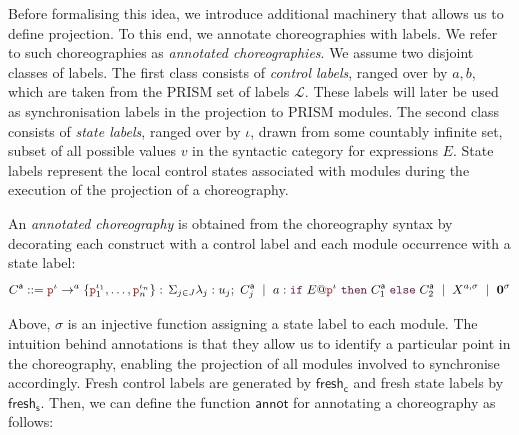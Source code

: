 Before formalising this idea, we introduce additional machinery that
allows us to define projection. To this end, we annotate choreographies
with labels. We refer to such choreographies as \emph{annotated
choreographies}. 
%
We assume two disjoint classes of labels. The first class consists of
\emph{control labels}, ranged over by $a,b$, which are taken from the
PRISM set of labels $\mathcal L$. These labels will later be used as
synchronisation labels in the projection to PRISM modules. The second
class consists of \emph{state labels}, ranged over by $\iota$, drawn
from some countably infinite set, subset of all possible values $v$ in
the syntactic category for expressions $E$. State labels represent the
local control states associated with modules during the execution of
the projection of a choreography.
%
\newcommand{\anno}[1]{{#1}^{\mathsf a}}
%
\begin{definition}
  An \emph{annotated choreography} is obtained from the choreography
  syntax by decorating each construct with a control label and each
  module occurrence with a state label:
  \[\small
    \anno{C} ::= 
      \interactl{\nr^{\iota}}a{\nr_1^{\iota_1},\ldots,\nr_n^{\iota_n}}
      \ \mid\ 
      a:\ifTE{E}{\nr^{\iota}}{\anno{C}_1}{\anno{C}_2}
      \ \mid\ 
      X^{a,\sigma}
      \ \mid\ 
      \CEnd^{\sigma}
  \]
\end{definition}
%
Above, $\sigma$ is an injective function assigning a state label to
each module.  The intuition behind annotations is that they allow us
to identify a particular point in the choreography, enabling the
projection of all modules involved to synchronise accordingly.
%
Fresh control labels are generated by $\mathsf{fresh}_{\mathsf c}$ and
fresh state labels by $\mathsf{fresh}_{\mathsf s}$. Then, we can
define the function $\mathsf{annot}$ for annotating a choreography as
follows:
%
